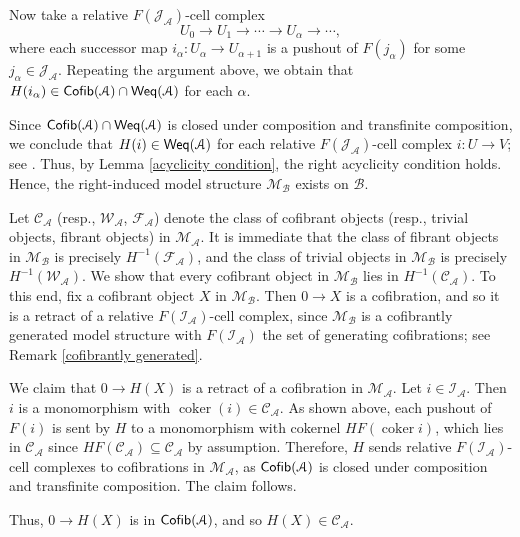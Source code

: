 \documentclass[12pt,twoside]{amsart}
\theoremstyle{bfupright head,slanted body}
\theoremstyle{bfupright head,upright body}
\theoremstyle{fixed bf head,slanted body}
\theoremstyle{fixed bf head,upright body}
\theoremstyle{numbered paragraph}
\newenvironment{prf*}[1][Proof]{%
  \begin{proof}[\bf #1]
    \setcounter{equation}{0}
    \renewcommand{\theequation}{\arabic{equation}}}
  {\end{proof}
}
\numberwithin{equation}{res}
\newcommand{\calC}{\mathcal{C}}
\newcommand{\calW}{\mathcal{W}}
\newcommand{\calF}{\mathcal{F}}
\newcommand{\calA}{\mathcal{A}}
\newcommand{\calB}{\mathcal{B}}
\newcommand{\calM}{\mathcal{M}}
\newcommand{\Cofib}{\sf{Cofib}}
\newcommand{\Weq}{\sf{Weq}}
\begin{document}
\begin{prf*}
Now take a relative \(F(\mathcal J_\calA)\)-cell complex
\[
U_0\to U_1\to \cdots \to U_\alpha\to \cdots,
\]
where each successor map \(i_\alpha: U_\alpha\to U_{\alpha+1}\) is a pushout of \(F(j_\alpha)\) for some \(j_\alpha\in \mathcal J_{\calA}\). Repeating the argument above, we obtain that
\(H(i_\alpha)\in \Cofib(\mathcal A)\cap\Weq(\mathcal A)\) for each \(\alpha\).

Since \(\Cofib(\mathcal A)\cap\Weq(\mathcal A)\) is closed under composition and transfinite composition, we conclude that \(H(i)\in \Weq(\mathcal A)\) for each relative \(F(\mathcal J_{\mathcal A})\)-cell complex \(i: U\to V\); see \cite[Proposition 10.3.4]{HPS2003}. Thus, by Lemma \ref{acyclicity condition}, the right acyclicity condition holds.
Hence, the right-induced model structure \(\calM_{\calB}\) exists on \(\mathcal B\).

Let \(\calC_{\calA}\) (resp., \(\calW_{\calA}\), \(\calF_{\calA}\)) denote the class of cofibrant objects (resp., trivial objects, fibrant objects) in \(\calM_{\calA}\). It is immediate that the class of fibrant objects in \(\calM_{\calB}\) is precisely \(H^{-1}(\calF_{\calA})\), and the class of trivial objects in \(\calM_{\calB}\) is precisely \(H^{-1}(\calW_{\calA})\). We show that every cofibrant object in \(\calM_{\calB}\) lies in \(H^{-1}(\calC_{\calA})\). To this end, fix a cofibrant object \(X\) in \(\calM_{\calB}\). Then \(0\to X\) is a cofibration, and so it is a retract of a relative \(F(\mathcal I_{\calA})\)-cell complex, since \(\calM_{\calB}\) is a cofibrantly generated model structure with \(F(\mathcal I_{\mathcal A})\) the set of generating cofibrations; see Remark \ref{cofibrantly generated}.

We claim that \(0\to H(X)\) is a retract of a cofibration in \(\calM_\calA\). Let \(i\in\mathcal I_{\calA}\). Then \(i\) is a monomorphism with
\(\operatorname{coker}(i)\in\mathcal C_{\calA}\). As shown above, each pushout of \(F(i)\) is sent by \(H\) to a monomorphism with cokernel
\(HF(\operatorname{coker}i)\), which lies in \(\mathcal C_{\calA}\) since
\(HF(\mathcal C_{\calA})\subseteq\mathcal C_{\calA}\) by assumption. Therefore, \(H\) sends relative
\(F(\mathcal I_{\calA})\)-cell complexes to cofibrations in \(\calM_\calA\), as \(\Cofib(\mathcal A)\) is closed under composition and transfinite composition. The claim follows.

Thus, \(0\to H(X)\) is in \(\Cofib(\mathcal A)\), and so \(H(X)\in\calC_{\calA}\).
\end{prf*}
\end{document}
